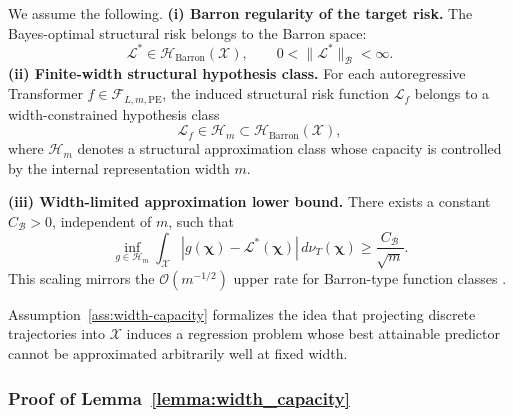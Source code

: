 \begin{assumption} \label{ass:width-capacity} We assume the following. \textbf{(i) Barron regularity of the target risk.} The Bayes-optimal structural risk belongs to the Barron space: \begin{equation} \mathcal{L}^* \in \mathcal{H}_{\mathrm{Barron}}(\mathcal{X}), \qquad 0 < \|\mathcal{L}^*\|_{\mathcal{B}} < \infty. \end{equation} \textbf{(ii) Finite-width structural hypothesis class.} For each autoregressive Transformer $f \in \mathcal{F}_{L,m,\mathrm{PE}}$, the induced structural risk function $\mathcal{L}_f$ belongs to a width-constrained hypothesis class \begin{equation} \mathcal{L}_f \in \mathcal{H}_m \subset \mathcal{H}_{\mathrm{Barron}}(\mathcal{X}), \end{equation} where $\mathcal{H}_m$ denotes a structural approximation class whose capacity is controlled by the internal representation width $m$. 

\textbf{(iii) Width-limited approximation lower bound.} There exists a constant $C_{\mathcal{B}}>0$, independent of $m$, such that \begin{equation} \inf_{g \in \mathcal{H}_m} \int_{\mathcal{X}} |g(\boldsymbol{\chi})-\mathcal{L}^*(\boldsymbol{\chi})| \,d\nu_T(\boldsymbol{\chi}) \ge \frac{C_{\mathcal{B}}}{\sqrt{m}}. \end{equation} This scaling mirrors the $\mathcal{O}(m^{-1/2})$ upper rate for Barron-type function classes \citep{Barron1993}. \end{assumption}

Assumption~\ref{ass:width-capacity} formalizes the idea that projecting discrete trajectories into $\mathcal{X}$ induces a regression problem whose best attainable predictor cannot be approximated arbitrarily well at fixed width.

\subsubsection{Proof of Lemma~\ref{lemma:width_capacity}}
\label{app:proof-width-capacity}

